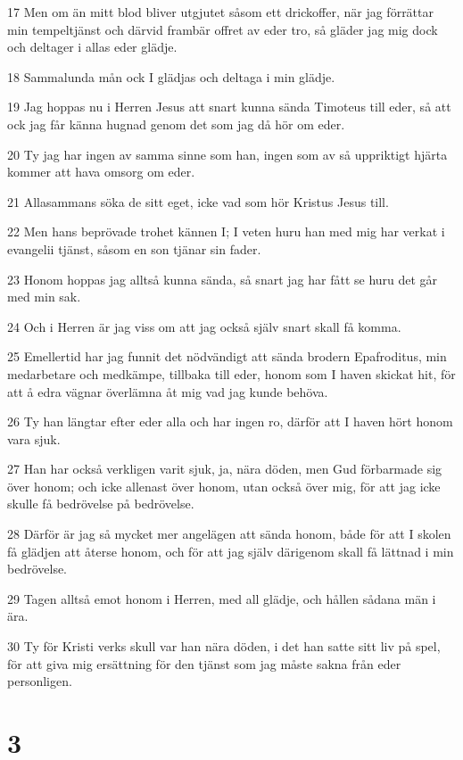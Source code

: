 \par 17 Men om än mitt blod bliver utgjutet såsom ett drickoffer, när jag förrättar min tempeltjänst och därvid frambär offret av eder tro, så gläder jag mig dock och deltager i allas eder glädje.
\par 18 Sammalunda mån ock I glädjas och deltaga i min glädje.
\par 19 Jag hoppas nu i Herren Jesus att snart kunna sända Timoteus till eder, så att ock jag får känna hugnad genom det som jag då hör om eder.
\par 20 Ty jag har ingen av samma sinne som han, ingen som av så uppriktigt hjärta kommer att hava omsorg om eder.
\par 21 Allasammans söka de sitt eget, icke vad som hör Kristus Jesus till.
\par 22 Men hans beprövade trohet kännen I; I veten huru han med mig har verkat i evangelii tjänst, såsom en son tjänar sin fader.
\par 23 Honom hoppas jag alltså kunna sända, så snart jag har fått se huru det går med min sak.
\par 24 Och i Herren är jag viss om att jag också själv snart skall få komma.
\par 25 Emellertid har jag funnit det nödvändigt att sända brodern Epafroditus, min medarbetare och medkämpe, tillbaka till eder, honom som I haven skickat hit, för att å edra vägnar överlämna åt mig vad jag kunde behöva.
\par 26 Ty han längtar efter eder alla och har ingen ro, därför att I haven hört honom vara sjuk.
\par 27 Han har också verkligen varit sjuk, ja, nära döden, men Gud förbarmade sig över honom; och icke allenast över honom, utan också över mig, för att jag icke skulle få bedrövelse på bedrövelse.
\par 28 Därför är jag så mycket mer angelägen att sända honom, både för att I skolen få glädjen att återse honom, och för att jag själv därigenom skall få lättnad i min bedrövelse.
\par 29 Tagen alltså emot honom i Herren, med all glädje, och hållen sådana män i ära.
\par 30 Ty för Kristi verks skull var han nära döden, i det han satte sitt liv på spel, för att giva mig ersättning för den tjänst som jag måste sakna från eder personligen.

\chapter{3}

